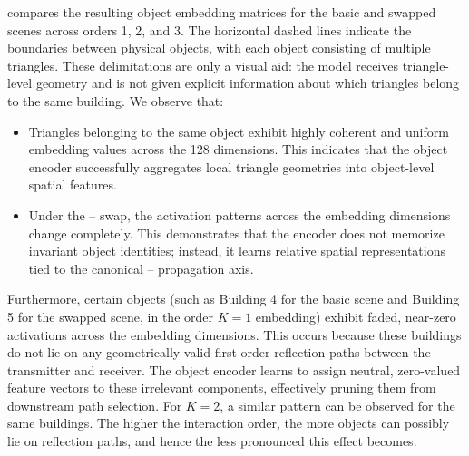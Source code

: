  compares the resulting object embedding matrices for the basic and swapped scenes across orders 1, 2, and 3. The horizontal dashed lines indicate the boundaries between physical objects, with each object consisting of multiple triangles. These delimitations are only a visual aid: the model receives triangle-level geometry and is not given explicit information about which triangles belong to the same building. We observe that:
\begin{itemize}
  \item Triangles belonging to the same object exhibit highly coherent and uniform embedding values across the 128 dimensions. This indicates that the object encoder successfully aggregates local triangle geometries into object-level spatial features.
  \item Under the -- swap, the activation patterns across the embedding dimensions change completely. This demonstrates that the encoder does not memorize invariant object identities; instead, it learns relative spatial representations tied to the canonical -- propagation axis.
\end{itemize}

Furthermore, certain objects (such as Building 4 for the basic scene and Building 5 for the swapped scene, in the order $K=1$ embedding) exhibit faded, near-zero activations across the embedding dimensions. This occurs because these buildings do not lie on any geometrically valid first-order reflection paths between the transmitter and receiver. The object encoder learns to assign neutral, zero-valued feature vectors to these irrelevant components, effectively pruning them from downstream path selection. For $K=2$, a similar pattern can be observed for the same buildings. The higher the interaction order, the more objects can possibly lie on reflection paths, and hence the less pronounced this effect becomes.

